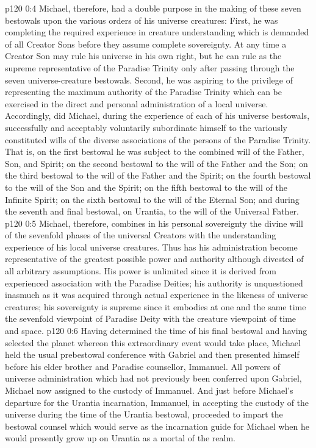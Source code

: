 \vs p120 0:4 Michael, therefore, had a double purpose in the making of these seven bestowals upon the various orders of his universe creatures: First, he was completing the required experience in creature understanding which is demanded of all Creator Sons before they assume complete sovereignty. At any time a Creator Son may rule his universe in his own right, but he can rule as the supreme representative of the Paradise Trinity only after passing through the seven universe\hyp{}creature bestowals. Second, he was aspiring to the privilege of representing the maximum authority of the Paradise Trinity which can be exercised in the direct and personal administration of a local universe. Accordingly, did Michael, during the experience of each of his universe bestowals, successfully and acceptably voluntarily subordinate himself to the variously constituted wills of the diverse associations of the persons of the Paradise Trinity. That is, on the first bestowal he was subject to the combined will of the Father, Son, and Spirit; on the second bestowal to the will of the Father and the Son; on the third bestowal to the will of the Father and the Spirit; on the fourth bestowal to the will of the Son and the Spirit; on the fifth bestowal to the will of the Infinite Spirit; on the sixth bestowal to the will of the Eternal Son; and during the seventh and final bestowal, on Urantia, to the will of the Universal Father.
\vs p120 0:5 Michael, therefore, combines in his personal sovereignty the divine will of the sevenfold phases of the universal Creators with the understanding experience of his local universe creatures. Thus has his administration become representative of the greatest possible power and authority although divested of all arbitrary assumptions. His power is unlimited since it is derived from experienced association with the Paradise Deities; his authority is unquestioned inasmuch as it was acquired through actual experience in the likeness of universe creatures; his sovereignty is supreme since it embodies at one and the same time the sevenfold viewpoint of Paradise Deity with the creature viewpoint of time and space.
\vs p120 0:6 \pc Having determined the time of his final bestowal and having selected the planet whereon this extraordinary event would take place, Michael held the usual prebestowal conference with Gabriel and then presented himself before his elder brother and Paradise counsellor, Immanuel. All powers of universe administration which had not previously been conferred upon Gabriel, Michael now assigned to the custody of Immanuel. And just before Michael’s departure for the Urantia incarnation, Immanuel, in accepting the custody of the universe during the time of the Urantia bestowal, proceeded to impart the bestowal counsel which would serve as the incarnation guide for Michael when he would presently grow up on Urantia as a mortal of the realm.
